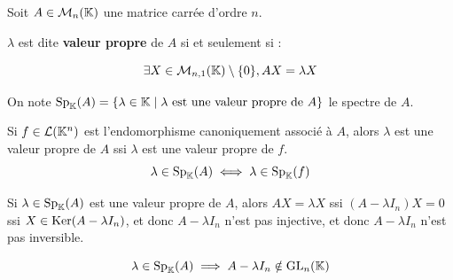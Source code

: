 \documentclass[12pt, a4paper]{report}
\begin{document}
\begin{definition}
    Soit $A \in \mathcal M_n(\mathbb{K})$ une matrice carrée d'ordre $n$.

    $\lambda$ est dite \textbf{valeur propre} de $A$ si et seulement si :
    
    $$\exists X \in \mathcal M_{n,1}(\mathbb{K}) \setminus \{0\}, AX = \lambda X$$

    On note $\mathrm{Sp}_{\mathbb{K}}(A) = \{\lambda \in \mathbb{K} \mid \lambda \text{ est une valeur propre de } A\}$ le spectre de $A$.
\end{definition}

\begin{remark}
    Si $f \in \mathcal L(\mathbb{K}^n)$ est l'endomorphisme canoniquement associé à $A$, alors $\lambda$ est une valeur propre de $A$ ssi $\lambda$ est une valeur propre de $f$.
    $$\lambda \in \mathrm{Sp}_{\mathbb{K}}(A) \iff \lambda \in \mathrm{Sp}_{\mathbb{K}}(f)$$
\end{remark}

\begin{remark}
    Si $\lambda \in \mathrm{Sp}_{\mathbb{K}}(A)$ est une valeur propre de $A$, alors $AX = \lambda X$ ssi $(A - \lambda I_n)X = 0$ ssi $X \in \mathrm{Ker}(A - \lambda I_n)$, et donc $A - \lambda I_n$ n'est pas injective, et donc $A - \lambda I_n$ n'est pas inversible.

    $$\lambda \in \mathrm{Sp}_{\mathbb{K}}(A) \implies A - \lambda I_n \notin \mathrm{GL}_n(\mathbb{K})$$
\end{remark}

\end{document}
